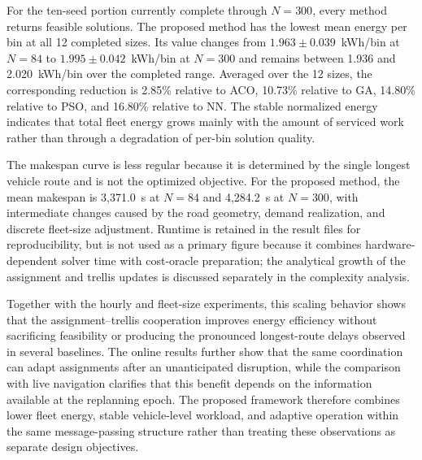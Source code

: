 For the ten-seed portion currently complete through $N=300$, every method
returns feasible solutions. The proposed method has the lowest mean energy per
bin at all 12 completed sizes. Its value changes from
$1.963\pm0.039$~kWh/bin at $N=84$ to $1.995\pm0.042$~kWh/bin at $N=300$ and
remains between 1.936 and 2.020~kWh/bin over the completed range. Averaged
over the 12 sizes, the corresponding reduction is 2.85\% relative to ACO,
10.73\% relative to GA, 14.80\% relative to PSO, and 16.80\% relative to NN.
The stable normalized energy indicates that total fleet energy grows mainly
with the amount of serviced work rather than through a degradation of
per-bin solution quality.

The makespan curve is less regular because it is determined by the single
longest vehicle route and is not the optimized objective. For the proposed
method, the mean makespan is 3,371.0~s at $N=84$ and 4,284.2~s at $N=300$,
with intermediate changes caused by the road geometry, demand realization,
and discrete fleet-size adjustment. Runtime is retained in the result files
for reproducibility, but is not used as a primary figure because it combines
hardware-dependent solver time with cost-oracle preparation; the analytical
growth of the assignment and trellis updates is discussed separately in the
complexity analysis.

Together with the hourly and fleet-size experiments, this scaling behavior
shows that the assignment--trellis cooperation improves energy efficiency
without sacrificing feasibility or producing the pronounced longest-route
delays observed in several baselines. The online results further show that the
same coordination can adapt assignments after an unanticipated disruption,
while the comparison with live navigation clarifies that this benefit depends
on the information available at the replanning epoch. The proposed framework
therefore combines lower fleet energy, stable vehicle-level workload, and
adaptive operation within the same message-passing structure rather than
treating these observations as separate design objectives.

